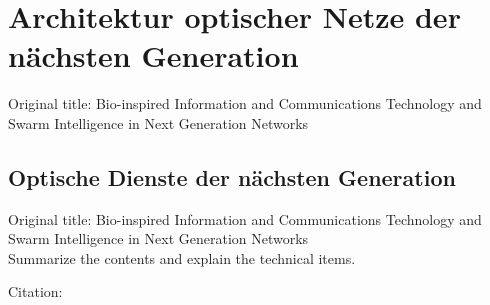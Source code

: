 \section{Architektur optischer Netze der n\"achsten Generation} 
%
Original title: Bio-inspired Information and Communications Technology and Swarm Intelligence in Next Generation Networks
\\

\subsection{Optische Dienste der n\"achsten Generation} 
%
Original title: Bio-inspired Information and Communications Technology and Swarm Intelligence in Next Generation Networks
\\

Summarize the contents and explain the technical items.

Citation: \cite{Ferstl.2006}
